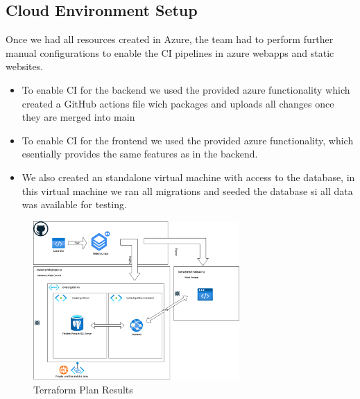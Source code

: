 \documentclass{llncs}
\begin{document}
\subsection{Cloud Environment Setup}


Once we had all resources created in Azure, the team had to perform further manual configurations to enable the CI pipelines in azure webapps and static websites.
\begin{itemize}
    \item To enable CI for the backend we used the provided azure functionality which created a GitHub actions file wich packages and uploads all changes once they are merged into main
    \item To enable CI for the frontend we used the provided azure functionality, which esentially provides the same features as in the backend.
    \item We also created an standalone virtual machine with access to the database, in this virtual machine we ran all migrations and seeded the database si all data was available for testing.
\end{itemize}

\begin{figure}[htbp]
    \begin{center}
        \includegraphics[width=0.7\textwidth]{../diagrams/webapp_tf_azure.drawio.png}
        \vspace{0.01\textwidth}
        \caption{Terraform Plan Results}
        \label{TerraformPlan} %
    \end{center}
\end{figure}
\end{document}
